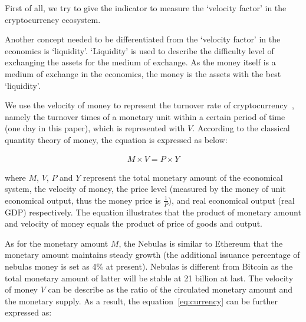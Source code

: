 First of all, we try to give the indicator to measure the `velocity factor' in the cryptocurrency ecosystem. 

Another concept needed to be differentiated from the `velocity factor' in the economics is `liquidity'. `Liquidity' is used to describe the difficulty level of exchanging the assets for the medium of exchange. As the money itself is a medium of exchange in the economics, the money is the assets with the best `liquidity'.


We use the velocity of money to represent the turnover rate of cryptocurrency~\cite{selden}, namely the turnover times of a monetary unit within a certain period of time (one day in this paper), which is represented with $V$. According to the classical quantity theory of money, the equation is expressed as below:

\begin{align}
M\times V=P\times Y
\label{eq:currency}
\end{align}

\noindent where $M$, $V$, $P$ and $Y$ represent the total monetary amount of the economical system, the velocity of money, the price level (measured by the money of unit economical output, thus the money price is $\frac{1}{P}$), and real economical output (real GDP) respectively. The equation illustrates that the product of monetary amount and velocity of money equals the product of price of goods and output.

As for the monetary amount $M$, the Nebulas is similar to Ethereum that the monetary amount maintains steady growth (the additional issuance percentage of nebulas money is set as 4\% at present). Nebulas is different from Bitcoin as the total monetary amount of latter will be stable at 21 billion at last. The velocity of money $V$ can be describe as the ratio of the circulated monetary amount and the monetary supply. As a result, the equation~\ref{eq:currency} can be further expressed as:

